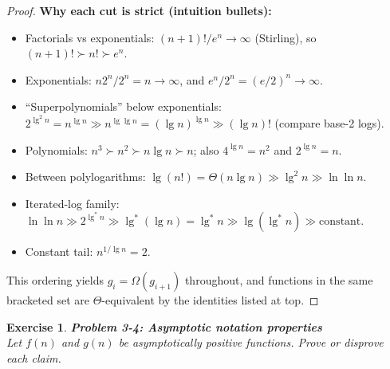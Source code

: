\documentclass[12pt]{article}
\newtheorem{exercise}[theorem]{Exercise}
\theoremstyle{definition}
\begin{document}
\begin{proof}
\noindent\textbf{Why each cut is strict (intuition bullets):}
\begin{itemize}
\item Factorials vs exponentials: $(n+1)!/e^n\!\to\!\infty$ (Stirling), so $(n+1)! \succ n! \succ e^n$.
\item Exponentials: $n2^n/2^n=n\!\to\!\infty$, and $e^n/2^n=(e/2)^n\!\to\!\infty$.
\item “Superpolynomials” below exponentials:
$2^{\lg^2 n}=n^{\lg n}\gg n^{\lg\lg n}=(\lg n)^{\lg n}\gg(\lg n)!$ (compare base-2 logs).
\item Polynomials: $n^3\succ n^2\succ n\lg n\succ n$; also $4^{\lg n}=n^2$ and $2^{\lg n}=n$.
\item Between polylogarithms:
$\lg(n!)=\Theta(n\lg n)\gg \lg^2 n\gg \ln\ln n$.
\item Iterated-log family:
$\ln\ln n\gg 2^{\lg^* n}\gg \lg^*(\lg n)=\lg^*n\gg \lg(\lg^*n)\gg \text{constant}$.
\item Constant tail: $n^{1/\lg n}=2$.
\end{itemize}

\noindent
This ordering yields $g_i=\Omega(g_{i+1})$ throughout, and functions in the same bracketed set are $\Theta$-equivalent by the identities listed at top.
\end{proof}

\newpage

\begin{exercise}
\noindent
\textbf{Problem 3-4: Asymptotic notation properties} \\
Let $f(n)$ and $g(n)$ be asymptotically positive functions. Prove or disprove each claim.
\end{exercise}
\end{document}
